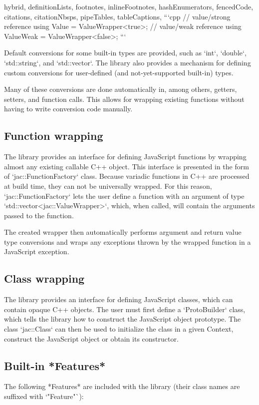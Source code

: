 \documentclass[
  digital,
  oneside,
  nosansbold,
  nocolorbold,
  lof,
  lot
]{fithesis4}
\begin{document}
\begin{markdown*}{%
  hybrid,
  definitionLists,
  footnotes,
  inlineFootnotes,
  hashEnumerators,
  fencedCode,
  citations,
  citationNbsps,
  pipeTables,
  tableCaptions,
}
```cpp
// value/strong reference
using Value = ValueWrapper<true>;
// value/weak reference
using ValueWeak = ValueWrapper<false>;
```

Default conversions for some built-in types are provided, such as `int`, `double`, `std::string`, and `std::vector`. The library also provides a mechanism for defining custom conversions for user-defined (and not-yet-supported built-in) types.

Many of these conversions are done automatically in, among others, getters, setters, and function calls. This allows for wrapping existing functions without having to write conversion code manually.

\subsection{Function wrapping}

The library provides an interface for defining JavaScript functions by wrapping almost any existing callable C++ object. This interface is presented in the form of `jac::FunctionFactory` class. Because variadic functions in C++ are processed at build time, they can not be universally wrapped. For this reason, `jac::FunctionFactory` lets the user define a function with an argument of type `std::vector<jac::ValueWrapper>`, which, when called, will contain the arguments passed to the function.

The created wrapper then automatically performs argument and return value type conversions and wraps any exceptions thrown by the wrapped function in a JavaScript exception.

\subsection{Class wrapping}

The library provides an interface for defining JavaScript classes, which can contain opaque C++ objects. The user must first define a `ProtoBuilder` class, which tells the library how to construct the JavaScript object prototype. The class `jac::Class` can then be used to initialize the class in a given Context, construct the JavaScript object or obtain its constructor.

\subsection{Built-in *Features*}

The following *Features* are included with the library (their class names are suffixed with `"Feature"`):


\end{markdown*}
\end{document}
